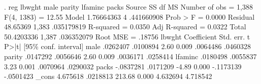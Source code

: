 . reg lbwght male parity lfaminc packs
{\smallskip}
      Source {\VBAR}       SS           df       MS      Number of obs   =     1,388
   F(4, 1383)      =     12.55
       Model {\VBAR}  1.76664363         4  .441660908   Prob > F        =    0.0000
    Residual {\VBAR}    48.65369     1,383  .035179819   R-squared       =    0.0350
   Adj R-squared   =    0.0322
       Total {\VBAR}  50.4203336     1,387  .036352079   Root MSE        =    .18756
{\smallskip}
      lbwght {\VBAR} Coefficient  Std. err.      t    P>|t|     [95\% conf. interval]
        male {\VBAR}   .0262407   .0100894     2.60   0.009     .0064486    .0460328
      parity {\VBAR}   .0147292   .0056646     2.60   0.009     .0036171    .0258414
     lfaminc {\VBAR}   .0180498   .0055837     3.23   0.001     .0070964    .0290032
       packs {\VBAR}  -.0837281   .0171209    -4.89   0.000    -.1173139   -.0501423
       _cons {\VBAR}   4.675618   .0218813   213.68   0.000     4.632694    4.718542
{\smallskip}
